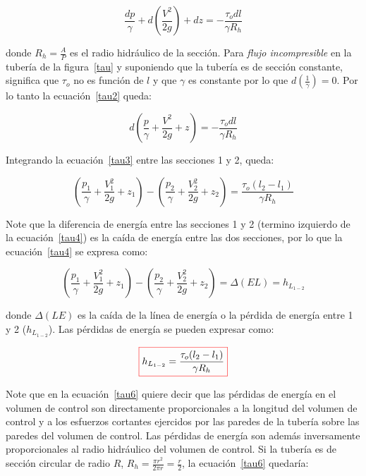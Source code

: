 \documentclass[11pt, oneside]{article}
\begin{document}
\begin{equation}
\frac{dp}{\gamma} + d\left( \frac{V^2}{2g} \right) + dz = -\frac{\tau_{o} dl}{\gamma R_h}
\label{tau2}
\end{equation}

donde $R_h = \frac{A}{P}$ es el radio hidr\'aulico de la secci\'on. Para \emph{flujo incompresible} en la tuber\'ia de la figura~\ref{tau}  y suponiendo que la tuber\'ia es de secci\'on constante, significa que $\tau_{o}$ no es funci\'on de $l$ y que $\gamma$ es constante por lo que $d\left( \frac{1}{\gamma} \right)=0$. Por lo tanto la ecuaci\'on~\ref{tau2} queda:

\begin{equation}
d \left( \frac{p}{\gamma} +\frac{V^2}{2g} + z \right) = -\frac{\tau_o dl}{\gamma R_h}
\label{tau3}
\end{equation}

Integrando la ecuaci\'on~\ref{tau3} entre las secciones 1 y 2, queda: 

\begin{equation}
\left( \frac{p_1}{\gamma} +\frac{V_1^2}{2g} + z_1 \right) - \left( \frac{p_2}{\gamma} +\frac{V_2^2}{2g} + z_2 \right) = \frac{\tau_o (l_2 - l_1 )}{\gamma R_h}  
\label{tau4}
\end{equation}

Note que la diferencia de energ\'ia entre las secciones 1 y 2 (termino izquierdo de la ecuaci\'on~\ref{tau4}) es la ca\'ida de energ\'ia entre las dos secciones, por lo que la ecuaci\'on~\ref{tau4} se expresa como:

\begin{equation}
\left( \frac{p_1}{\gamma} +\frac{V_1^2}{2g} + z_1 \right) - \left( \frac{p_2}{\gamma} +\frac{V_2^2}{2g} + z_2 \right) = \Delta (EL) = h_{L_{1-2}}
\label{tau5}
\end{equation}

donde $\Delta (LE)$ es la ca\'ida de la l\'inea de energ\'ia o la p\'erdida de energ\'ia entre 1 y 2 ($h_{L_{1-2}}$). Las p\'erdidas de energ\'ia se pueden expresar como:

\begin{equation}
\color{red}\boxed{\color{black} h_{L_{1-2}} = \frac{\tau_o (l_2 - l_1 )}{\gamma R_h} }  
\label{tau6}
\end{equation}

Note que en la ecuaci\'on~\ref{tau6} quiere decir que las p\'erdidas de energ\'ia en el volumen de control son directamente proporcionales a la longitud del volumen de control y a los esfuerzos cortantes ejercidos por las paredes de la tuber\'ia sobre las paredes del volumen de control. Las p\'erdidas de energ\'ia son adem\'as inversamente proporcionales al radio hidr\'aulico del volumen de control. Si la tuber\'ia es de secci\'on circular de radio $R$, $R_h = \frac{\pi r^2}{2\pi r} = \frac{r}{2}$,  la ecuaci\'on~\ref{tau6} quedar\'ia:
\end{document}
